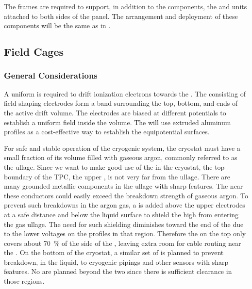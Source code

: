 The  frames are required to support, in addition to the  components, the  and  units attached to both sides of the  panel. The arrangement and deployment of these components will be the same as in .  
\subsection{Field Cages}
\subsubsection{General Considerations}

A uniform \efield{} is required to drift ionization electrons towards the . The  consisting of field shaping electrodes form a band surrounding the top, bottom, and ends of the active drift volume. The electrodes are biased at different potentials to establish a uniform field inside the  volume.
The  will use extruded aluminum profiles as a cost-effective way to establish the equipotential surfaces. 

For safe and stable operation of the \lar cryogenic system, the cryostat must have a small fraction of its volume filled with gaseous argon, commonly referred to as the ullage. Since we want to make good use of the \lar in the cryostat, the top boundary of the TPC, the upper , is not very far from the ullage. There are many grounded metallic components in the ullage with sharp features.  The \efield near these conductors could easily exceed the breakdown strength of gaseous argon. To prevent such breakdowns in the argon gas, a  is added above the upper  electrodes at a safe distance and below the liquid surface to shield the high \efield from entering the gas ullage.  The need for such shielding diminishes toward the  end of the  due to the lower voltages on the  profiles in that region. Therefore the  on the top only covers about \SI{70}{\%} of the  side of the , leaving extra room for cable routing near the .
On the bottom of the cryostat, a similar set of  is planned to prevent breakdown, in the liquid, to cryogenic pipings and other sensors with sharp features.  No  are planned beyond the two  since there is sufficient clearance in those regions.  

